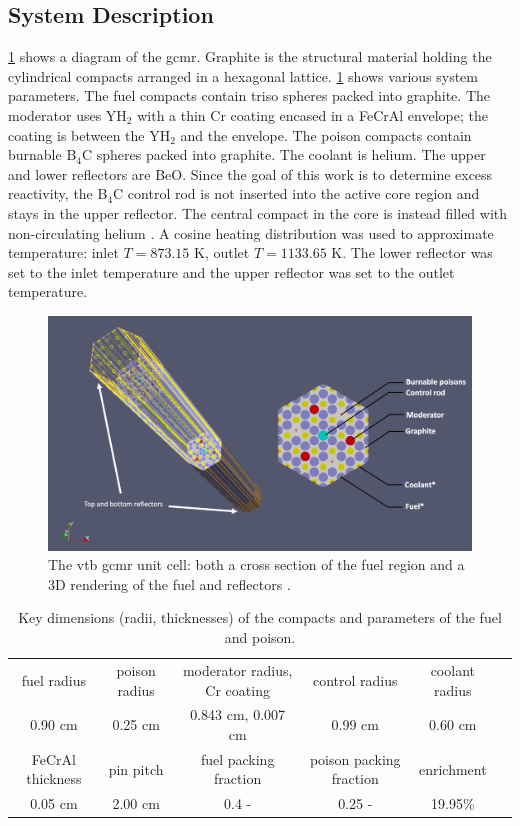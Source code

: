 \documentclass[letterpaper]{physor2024}
\begin{document}
\subsection{System Description}\label{sec:system}
\cref{fig:vtb_gcmr} shows a diagram of the \gls{gcmr}. Graphite is the structural material holding the cylindrical compacts arranged in a hexagonal lattice. \cref{tab:dimensions} shows various system parameters. The fuel compacts contain \gls{triso} spheres packed into graphite. The moderator uses YH$_{2}$ with a thin Cr coating encased in a FeCrAl envelope; the coating is between the YH$_{2}$ and the envelope. The poison compacts contain burnable B$_{4}$C spheres packed into graphite. The coolant is helium. The upper and lower reflectors are BeO. Since the goal of this work is to determine excess reactivity, the B$_{4}$C control rod is not inserted into the active core region and stays in the upper reflector. The central compact in the core is instead filled with non-circulating helium \cite{Abdelhameed-ANS-2022}. A cosine heating distribution was used to approximate temperature: inlet $T=873.15$ K, outlet $T=1133.65$ K. The lower reflector was set to the inlet temperature and the upper reflector was set to the outlet temperature.
\vspace*{-0.2cm}
 \begin{figure}[h]
    \centering
    \includegraphics[width=0.625\linewidth]{figures/vtb_gcmr_diagram.jpg}
    \caption{The \gls{vtb} \gls{gcmr} unit cell: both a cross section of the fuel region and a 3D rendering of the fuel and reflectors \cite{Stauff-applications-2022}.}
    \label{fig:vtb_gcmr}
\end{figure}
\vspace{-0.25cm}
\begin{table}[h]
    \centering
    \caption{Key dimensions (radii, thicknesses) of the compacts and parameters of the fuel and poison.}
    \begin{tabular}{|c|c|c|c|c|c|}
    \hline
    fuel radius & poison radius & moderator radius, Cr coating & control radius & coolant radius \\
    0.90 cm & 0.25 cm   & 0.843 cm, 0.007 cm & 0.99 cm    & 0.60 cm  \\
    \hline
    FeCrAl thickness & pin pitch & fuel packing fraction & poison packing fraction & enrichment \\
    0.05 cm & 2.00 cm  & 0.4 -  & 0.25 - & 19.95\% \\
    \hline
    \end{tabular}
    \vspace{-0.25cm}
    \label{tab:dimensions}
\end{table}
\end{document}
